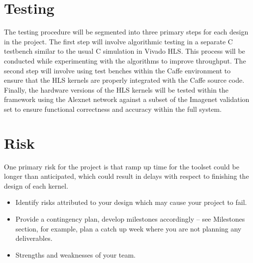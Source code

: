 \documentclass[conference,compsoc]{IEEEtran/IEEEtran}
\begin{document}
\section{Testing}\label{section:testing}
The testing procedure will be segmented into three primary steps for each design in the project.
The first step will involve algorithmic testing in a separate C testbench similar to the usual C
simulation in Vivado HLS. This process will be conducted while experimenting with the algorithms
to improve throughput. The second step will involve using test benches within the Caffe environment
to ensure that the HLS kernels are properly integrated with the Caffe source code. Finally, the
hardware versions of the HLS kernels will be tested within the framework using the Alexnet network
against a subset of the Imagenet validation set to ensure functional correctness and accuracy
within the full system.

\section{Risk}\label{section:risk}

One primary risk for the project is that ramp up time for the toolset could be longer than
anticipated, which could result in delays with respect to finishing the design of each kernel.

\begin{itemize}
\item Identify risks attributed to your design which may cause your project to fail.
\item Provide a contingency plan, develop milestones accordingly -- see Milestones section, for example, plan a catch up week where you are not planning any deliverables.
\item Strengths and weaknesses of your team.
\end{itemize}
\end{document}
